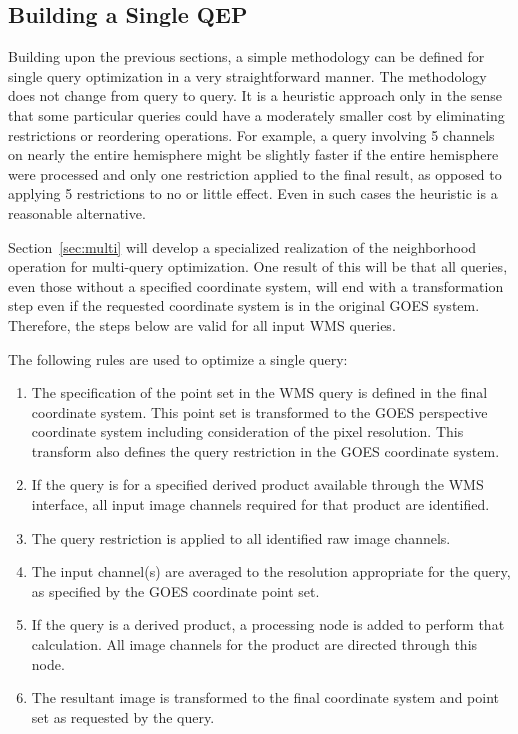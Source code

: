 \documentclass{ucdthesis}       %
\begin{document}
\subsection{Building a Single \acl{QEP}}
\label{sec:single-plan}

Building upon the previous sections, a simple methodology can be
defined for single query optimization in a very straightforward
manner.  The methodology does not change from query to query.  It is a
heuristic approach only in the sense that some particular queries
could have a moderately smaller cost by eliminating restrictions or
reordering operations. For example, a query involving 5 channels on
nearly the entire hemisphere might be slightly faster if the entire
hemisphere were processed and only one restriction applied to the
final result, as opposed to applying 5 restrictions to no or little
effect.  Even in such cases the heuristic is a reasonable alternative.

Section~\ref{sec:multi} will develop a specialized realization of the
neighborhood operation for multi-query optimization.  One result of
this will be that all queries, even those without a specified
coordinate system, will end with a transformation step even if the
requested coordinate system is in the original \ac{GOES} system.
Therefore, the steps below are valid for all input \ac{WMS} queries.

The following rules are used to optimize a single query:

\begin{enumerate}

\item The specification of the point set in the \ac{WMS} query is
  defined in the final coordinate system.  This point set is
  transformed to the \ac{GOES} perspective coordinate system including
  consideration of the pixel resolution.  This transform also defines
  the query restriction in the \ac{GOES} coordinate system.

\item If the query is for a specified derived product available
  through the \ac{WMS} interface, all input image channels required
  for that product are identified.

\item The query restriction is applied to all identified raw image channels.

\item The input channel(s) are averaged to the resolution appropriate
  for the query, as specified by the \ac{GOES} coordinate point set.

\item If the query is a derived product, a processing node is added to
  perform that calculation.  All image channels for the product are
  directed through this node.

\item The resultant image is transformed to the final coordinate
  system and point set as requested by the query.

\end{enumerate}
\end{document}
